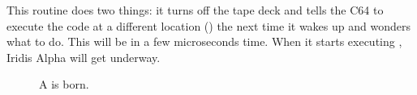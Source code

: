 This routine does two things: it turns off the tape deck and tells the C64 to execute the code at a different
location () the next time it wakes up and wonders what to do. This will be in a few
microseconds time. When it starts executing , Iridis Alpha will get underway.

 
\begin{figure}[H]
  {
    \begin{adjustbox}{width=10cm,center}
    \end{adjustbox}
  }\caption[]{A  is born.}
\end{figure}


